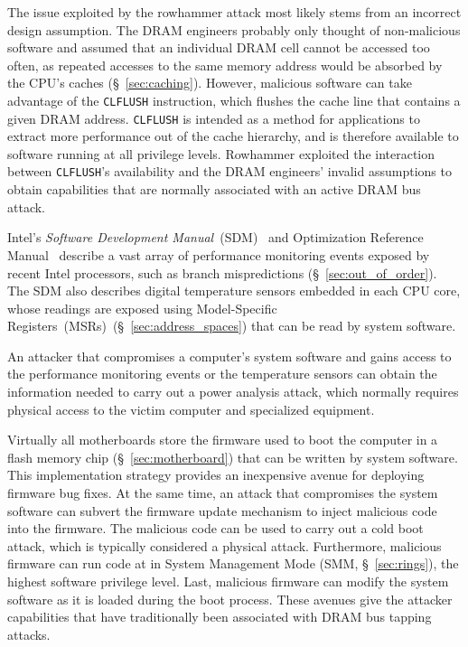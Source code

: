 The issue exploited by the rowhammer attack most likely stems from an incorrect
design assumption. The DRAM engineers probably only thought of non-malicious
software and assumed that an individual DRAM cell cannot be accessed too
often, as repeated accesses to the same memory address would be absorbed by the
CPU's caches (\S~\ref{sec:caching}). However, malicious software can take
advantage of the \texttt{CLFLUSH} instruction, which flushes the cache line
that contains a given DRAM address. \texttt{CLFLUSH} is intended as a method
for applications to extract more performance out of the cache hierarchy, and
is therefore available to software running at all privilege levels. Rowhammer
exploited the interaction between \texttt{CLFLUSH}'s availability and the DRAM
engineers' invalid assumptions to obtain capabilities that are normally
associated with an active DRAM bus attack.


Intel's \textit{Software Development Manual}~(SDM)~\cite{intel2015sdm} and
Optimization Reference Manual~\cite{intel2014optimization} describe a vast
array of performance monitoring events exposed by recent Intel processors,
such as branch mispredictions (\S~\ref{sec:out_of_order}). The SDM also
describes digital temperature sensors embedded in each CPU core, whose readings
are exposed using Model-Specific Registers~(MSRs)~(\S~\ref{sec:address_spaces})
that can be read by system software.

An attacker that compromises a computer's system software and gains access to
the performance monitoring events or the temperature sensors can obtain the
information needed to carry out a power analysis attack, which normally
requires physical access to the victim computer and specialized equipment.

Virtually all motherboards store the firmware used to boot the computer in a
flash memory chip (\S~\ref{sec:motherboard}) that can be written by system
software. This implementation strategy provides an inexpensive avenue for
deploying firmware bug fixes. At the same time, an attack that compromises the
system software can subvert the firmware update mechanism to inject malicious
code into the firmware. The malicious code can be used to carry out a cold boot
attack, which is typically considered a physical attack. Furthermore, malicious
firmware can run code at in System Management Mode (SMM, \S~\ref{sec:rings}),
the highest software privilege level. Last, malicious firmware can modify the
system software as it is loaded during the boot process. These avenues give the
attacker capabilities that have traditionally been associated with DRAM bus
tapping attacks.

